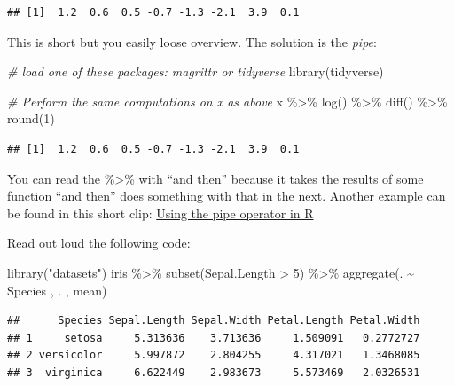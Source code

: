 \documentclass[
  12pt,
  oneside]{book}
\newenvironment{Shaded}{\begin{snugshade}}{\end{snugshade}}
\newcommand{\CommentTok}[1]{\textcolor[rgb]{0.56,0.35,0.01}{\textit{#1}}}
\newcommand{\DecValTok}[1]{\textcolor[rgb]{0.00,0.00,0.81}{#1}}
\newcommand{\FunctionTok}[1]{\textcolor[rgb]{0.00,0.00,0.00}{#1}}
\newcommand{\NormalTok}[1]{#1}
\newcommand{\SpecialCharTok}[1]{\textcolor[rgb]{0.00,0.00,0.00}{#1}}
\newcommand{\StringTok}[1]{\textcolor[rgb]{0.31,0.60,0.02}{#1}}
\theoremstyle{definition}
\theoremstyle{definition}
\theoremstyle{definition}
\theoremstyle{definition}
\theoremstyle{remark}
\begin{document}
\begin{verbatim}
## [1]  1.2  0.6  0.5 -0.7 -1.3 -2.1  3.9  0.1
\end{verbatim}

This is short but you easily loose overview. The solution is the \emph{pipe}:

\begin{Shaded}
\begin{Highlighting}[]
\CommentTok{\# load one of these packages: \textasciigrave{}magrittr\textasciigrave{} or \textasciigrave{}tidyverse\textasciigrave{}}
\FunctionTok{library}\NormalTok{(tidyverse)}

\CommentTok{\# Perform the same computations on \textasciigrave{}x\textasciigrave{} as above}
\NormalTok{x }\SpecialCharTok{\%\textgreater{}\%} \FunctionTok{log}\NormalTok{() }\SpecialCharTok{\%\textgreater{}\%}
    \FunctionTok{diff}\NormalTok{() }\SpecialCharTok{\%\textgreater{}\%}
    \FunctionTok{round}\NormalTok{(}\DecValTok{1}\NormalTok{)}
\end{Highlighting}
\end{Shaded}

\begin{verbatim}
## [1]  1.2  0.6  0.5 -0.7 -1.3 -2.1  3.9  0.1
\end{verbatim}

You can read the \%\textgreater\% with ``and then'' because it takes the results of some function ``and then'' does something with that in the next.
Another example can be found in this short clip: \href{https://youtu.be/PX5NuteZ3Vg}{Using the pipe operator in R}

Read out loud the following code:

\begin{Shaded}
\begin{Highlighting}[]
\FunctionTok{library}\NormalTok{(}\StringTok{"datasets"}\NormalTok{)}
\NormalTok{iris }\SpecialCharTok{\%\textgreater{}\%}
  \FunctionTok{subset}\NormalTok{(Sepal.Length }\SpecialCharTok{\textgreater{}} \DecValTok{5}\NormalTok{) }\SpecialCharTok{\%\textgreater{}\%}
  \FunctionTok{aggregate}\NormalTok{(. }\SpecialCharTok{\textasciitilde{}}\NormalTok{ Species , . , mean)}
\end{Highlighting}
\end{Shaded}

\begin{verbatim}
##      Species Sepal.Length Sepal.Width Petal.Length Petal.Width
## 1     setosa     5.313636    3.713636     1.509091   0.2772727
## 2 versicolor     5.997872    2.804255     4.317021   1.3468085
## 3  virginica     6.622449    2.983673     5.573469   2.0326531
\end{verbatim}
\end{document}
